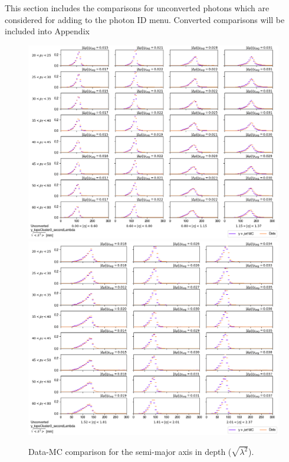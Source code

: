 This section includes the comparisons for unconverted photons which are considered for adding to the photon ID menu. Converted comparisons will be included into Appendix 



\begin{figure}[!thp]
    \centering
    \includegraphics[width=.80\textwidth]{chapters/chapter4_photonID/images/y_topoCluster0_secondLambda_Unconverted_lowerEta.png}
    \includegraphics[width=.80\textwidth]{chapters/chapter4_photonID/images/y_topoCluster0_secondLambda_Unconverted_upperEta.png}
    \caption{Data-MC comparison for the semi-major axis in depth ($\sqrt{\lambda^2}$).}
\end{figure}
